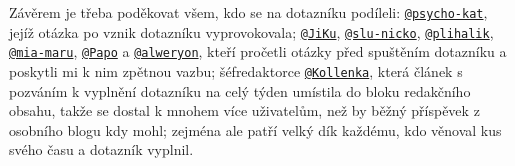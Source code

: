 \documentclass[12pt, a4paper, twoside]{article}
\makeatletter
\newcommand{\suser}[1]{\href{https://www.signaly.cz/#1}{\texttt{@#1}}}
\makeatother
\begin{document}
Závěrem je třeba poděkovat všem, kdo se na dotazníku podíleli:
\suser{psycho-kat}, jejíž otázka po 
vznik dotazníku vyprovokovala;
\suser{JiKu}, \suser{slu-nicko}, \suser{plihalik}, \suser{mia-maru},
\suser{Papo} a \suser{alweryon}, kteří pročetli otázky před spuštěním
dotazníku a poskytli mi k nim zpětnou vazbu;
šéfredaktorce \suser{Kollenka}, která článek s pozváním k vyplnění
dotazníku na celý týden umístila do bloku redakčního obsahu,
takže se dostal
k mnohem více uživatelům, než by běžný příspěvek z osobního blogu
kdy mohl;
zejména ale patří velký dík každému, kdo věnoval kus svého času
a dotazník vyplnil.

\tableofcontents

\printbibliography
\end{document}
